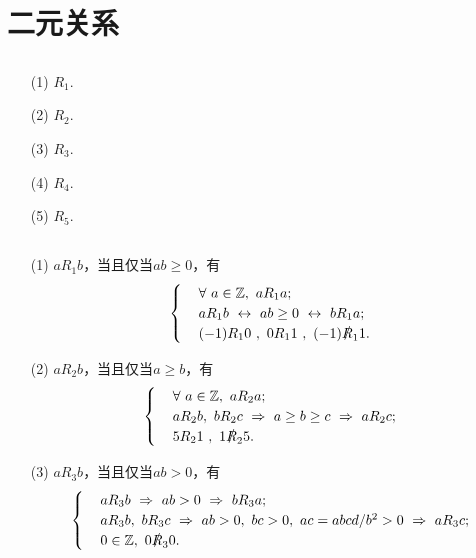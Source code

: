 \documentclass[UTF8]{ctexart}
\begin{document}
\fancyfoot[C]{\thepage}

\section{二元关系}
\subsection{}   %
\begin{enumerate}
    \item [(1)]$R_1$.
    \item [(2)]$R_2$.
    \item [(3)]$R_3$.
    \item [(4)]$R_4$.
    \item [(5)]$R_5$.
\end{enumerate}

\subsection{}   %
\begin{enumerate}
    \item [(1)]$a R_1 b$，当且仅当$ab \geq 0$，有
    \[
        \begin{cases}
            &\forall\ a\in \mathbb{Z},\ a R_1 a;\\
            &a R_1 b \ \leftrightarrow\ ab\geq 0 \ \leftrightarrow\ b R_1 a;\\
            &(-1) R_1 0\ ,\ 0 R_1 1\ ,\ (-1)\slashed{R}_1 1 .
        \end{cases}
    \]
    \item [(2)]$a R_2 b$，当且仅当$a \geq b$，有
    \[
        \begin{cases}
            &\forall\ a\in \mathbb{Z},\ a R_2 a;\\
            &a R_2 b,\ b R_2 c \ \Rightarrow\ a\geq b \geq c \ \Rightarrow\ a R_2 c;\\
            &5 R_2 1\ , \ 1\slashed{R}_2 5 .
        \end{cases}
    \]
    \item [(3)]$a R_3 b$，当且仅当$ab > 0$，有
    \[
        \begin{cases}
            &a R_3 b \ \Rightarrow\ ab>0 \ \Rightarrow\ b R_3 a;\\
            &a R_3 b,\ b R_3 c \ \Rightarrow\ ab>0,\ bc>0,\ ac=abcd/b^2>0 \ \Rightarrow\ a R_3 c;\\
            &0\in\mathbb{Z},\ 0 \slashed{R}_3 0.
        \end{cases}
    \]
\end{enumerate}
\end{document}
